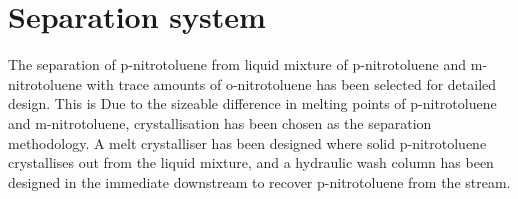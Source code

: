 \section*{Separation system}

The separation of p-nitrotoluene from liquid mixture of p-nitrotoluene and m-nitrotoluene with trace amounts of o-nitrotoluene has been selected for detailed design. This is Due to the sizeable difference in melting points of p-nitrotoluene and m-nitrotoluene, crystallisation has been chosen as the separation methodology. A melt crystalliser has been designed where solid p-nitrotoluene crystallises out from the liquid mixture, and a hydraulic wash column has been designed in the immediate downstream to recover p-nitrotoluene from the stream. 